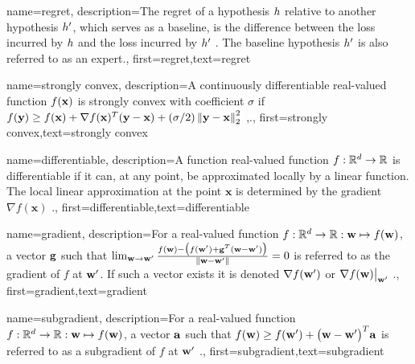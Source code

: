 {name={regret},
	description={The regret of a \gls{hypothesis} $h$ relative to 
		another \gls{hypothesis} $h'$, which serves as a \gls{baseline}, 
		is the difference between the \gls{loss} incurred by $h$ and the \gls{loss} 
		incurred by $h'$ \cite{PredictionLearningGames}. 
		The \gls{baseline} \gls{hypothesis} $h'$ is also referred to as an \gls{expert}.},
	first={regret},text={regret} 
}

{name={strongly convex},
	description={A continuously \gls{differentiable} real-valued 
		function $f({\bf x})$ is strongly convex with coefficient $\sigma$ if $f({\bf y}) \geq f({\bf x}) + \nabla f({\bf x})^{T} ({\bf y} - {\bf x}) + (\sigma/2) \left\Vert {{\bf y}- {\bf x}} \right\Vert_{2}^{2}$ \cite{nesterov04},\cite[Sec. B.1.1.]{CvxAlgBertsekas}.},
	first={strongly convex},text={strongly convex} 
}

{name={differentiable},
	description={A function real-valued function $f: \mathbb{R}^{d} \rightarrow \mathbb{R}$ 
		is differentiable if it can, at any point, be approximated locally by a linear 
		function. The local linear approximation at the point $\mathbf{x}$ is determined 
		by the \gls{gradient} $\nabla f ( \mathbf{x})$ \cite{RudinBookPrinciplesMatheAnalysis}.},
	first={differentiable},text={differentiable} 
}

{name={gradient},
	description={For a real-valued function $f: \mathbb{R}^{d} \rightarrow \mathbb{R}: {\bf w} \mapsto f({\bf w})$, 
	a vector ${\bf g}$ such that $\lim_{{\bf w} \rightarrow {\bf w}'} \frac{f({\bf w}) - \big(f({\bf w}')+ {\bf g}^{T} ({\bf w}- {\bf w}') \big) }{\| {\bf w}-{\bf w}'\|}=0$ 
	is referred to as the gradient of $f$ at ${\bf w}'$. If such a vector exists it is 
	denoted $\nabla f({\bf w}')$ or $\nabla f({\bf w})\big|_{{\bf w}'}$ \cite{RudinBookPrinciplesMatheAnalysis}.},
	first={gradient},text={gradient} 
}

{name={subgradient},
description={For a real-valued function $f: \mathbb{R}^{d} \rightarrow \mathbb{R}: {\bf w} \mapsto f({\bf w})$, 
		a vector ${\bf a}$ such that $f({\bf w}) \geq  f({\bf w}') +\big({\bf w}-{\bf w}' \big)^{T} {\bf a}$ is 
		referred to as a subgradient of $f$ at ${\bf w}'$ \cite{BertCvxAnalOpt,BertsekasNonLinProgr}.},
	first={subgradient},text={subgradient} 
}

